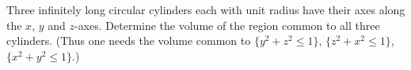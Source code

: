 Three infinitely long circular cylinders each with unit radius have their axes
along the $x$, $y$ and $z$-axes. Determine the volume of the region common to
all three cylinders. (Thus one needs the volume common to $\lbrace y^2 + z^2
\le 1\rbrace$, $\lbrace z^2 + x^2 \le 1\rbrace$, $\lbrace x^2 + y^2 \le
1\rbrace$.)
